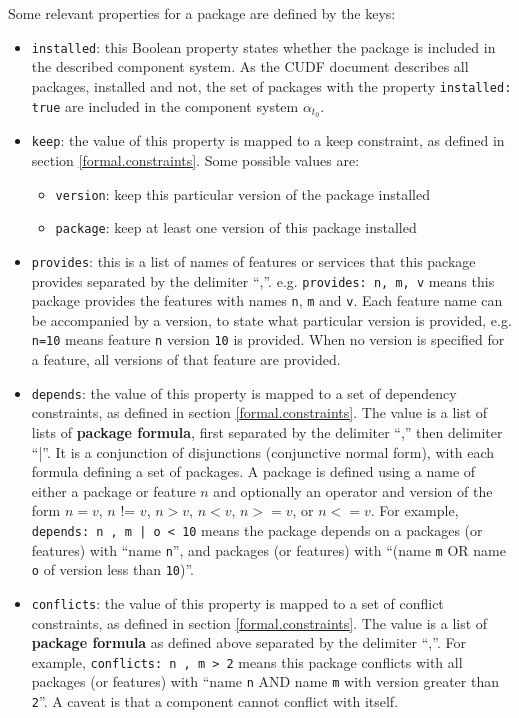 Some relevant properties for a package are defined by the keys:
\begin{itemize}
  \item \verb+installed+: this Boolean property states whether the package is included in the described component system. 
  As the CUDF document describes all packages, installed and not, the set of packages with the property \verb+installed: true+ are included in the component system $\alpha_{t_{0}}$.
  \item \verb+keep+: the value of this property is mapped to a keep constraint, as defined in section \ref{formal.constraints}.
  Some possible values are:
	  	\begin{itemize}
	  		\item \verb+version+: keep this particular version of the package installed
	  		\item \verb+package+: keep at least one version of this package installed
		\end{itemize}
  \item \verb+provides+: this is a list of names of features or services that this package provides separated by the delimiter ``,''.
  e.g. \verb+provides: n, m, v+ means this package provides the features with names \verb+n+, \verb+m+ and \verb+v+.
  Each feature name can be accompanied by a version, to state what particular version is provided, e.g. \verb+n=10+ means feature \verb+n+ version \verb+10+ is provided.
  When no version is specified for a feature, all versions of that feature are provided.
  \item \verb+depends+: the value of this property is mapped to a set of dependency constraints, as defined in section \ref{formal.constraints}.
  The value is a list of lists of \textbf{package formula}, first separated by the delimiter ``,'' then delimiter ``|''.
  It is a conjunction of disjunctions (conjunctive normal form), with each formula defining a set of packages.
  A package is defined using a name of either a package or feature $n$ and optionally an operator and version of the form  $n = v$, $n$ != $v$, $n > v$, $n < v$, $n >= v$, or $n <= v$.
  For example, \verb+depends: n , m | o < 10+ means the package depends on a packages (or features) with ``name \verb+n+'',
   and  packages (or features) with ``(name \verb+m+ OR name \verb+o+ of version less than \verb+10+)''.  
  \item \verb+conflicts+: the value of this property is mapped to a set of conflict constraints, as defined in section \ref{formal.constraints}.
  The value is a list of \textbf{package formula} as defined above separated by the delimiter ``,''.
  For example, \verb+conflicts: n , m > 2+ means this package conflicts with all packages (or features) with ``name \verb+n+ AND name \verb+m+ with version greater than \verb+2+''.
  A caveat is that a component cannot conflict with itself.
\end{itemize}

